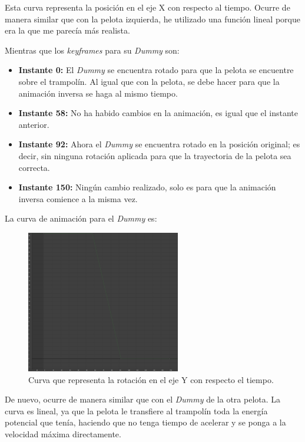 Esta curva representa la posición en el eje X con respecto al tiempo. Ocurre de manera similar que con la pelota izquierda, he utilizado una función lineal porque era la que me parecía más realista.

\newpage

Mientras que los \textit{keyframes} para su \textit{Dummy} son:

\begin{itemize}
    \item \textbf{Instante 0: }El \textit{Dummy} se encuentra rotado para que la pelota se encuentre sobre el trampolín. Al igual que con la pelota, se debe hacer para que la animación inversa se haga al mismo tiempo.
    \item \textbf{Instante 58: }No ha habido cambios en la animación, es igual que el instante anterior.
    \item \textbf{Instante 92: }Ahora el \textit{Dummy} se encuentra rotado en la posición original; es decir, sin ninguna rotación aplicada para que la trayectoria de la pelota sea correcta.
    \item \textbf{Instante 150: }Ningún cambio realizado, solo es para que la animación inversa comience a la misma vez.
\end{itemize}

\bigskip

La curva de animación para el \textit{Dummy} es:

\begin{figure}[H]
    \centering
    \includegraphics[width=0.6\textwidth]{imagenes/curvas/PR/dummy/green.png}
    \caption{Curva que representa la rotación en el eje Y con respecto el tiempo.}
\end{figure}

De nuevo, ocurre de manera similar que con el \textit{Dummy} de la otra pelota. La curva es lineal, ya que la pelota le transfiere al trampolín toda la energía potencial que tenía, haciendo que no tenga tiempo de acelerar y se ponga a la velocidad máxima directamente.

